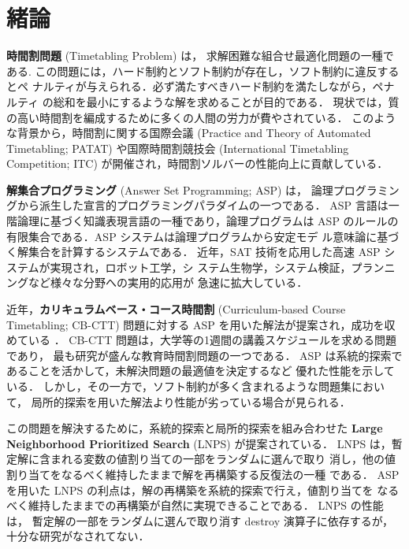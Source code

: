 \chapter{緒論}


\textbf{時間割問題} (Timetabling Problem) は，
求解困難な組合せ最適化問題の一種である.
この問題には，ハード制約とソフト制約が存在し，ソフト制約に違反するとペ
ナルティが与えられる．必ず満たすべきハード制約を満たしながら，ペナルティ
の総和を最小にするような解を求めることが目的である．
現状では，質の高い時間割を編成するために多くの人間の労力が費やされている．
このような背景から，時間割に関する国際会議
(Practice and Theory of Automated Timetabling; PATAT)
や国際時間割競技会 (International Timetabling Competition; ITC)
が開催され，時間割ソルバーの性能向上に貢献している．

\textbf{解集合プログラミング} (Answer Set Programming; ASP) 
\cite{%
  Baral03:cambridge,%
  Gelfond88:iclp,%
  Inoue08:jssst,%
  Niemela99:amai}
  は，
論理プログラミングから派生した宣言的プログラミングパラダイムの一つである．
ASP 言語は一階論理に基づく知識表現言語の一種であり，論理プログラムは
ASP のルールの有限集合である．ASP システムは論理プログラムから安定モデ
ル意味論に基づく解集合を計算するシステムである．
近年，SAT 技術を応用した高速 ASP システムが実現され，ロボット工学，シ
ステム生物学，システム検証，プランニングなど様々な分野への実用的応用が
急速に拡大している．

近年，\textbf{カリキュラムベース・コース時間割}
(Curriculum-based Course Timetabling; CB-CTT)
問題に対する ASP を用いた解法が提案され，成功を収めている
\cite{%
 banbara17:ramp}．
CB-CTT 問題は，大学等の1週間の講義スケジュールを求める問題であり，
最も研究が盛んな教育時間割問題の一つである．
ASP は系統的探索であることを活かして，未解決問題の最適値を決定するなど
優れた性能を示している．
しかし，その一方で，ソフト制約が多く含まれるような問題集において，
局所的探索を用いた解法より性能が劣っている場合が見られる．

この問題を解決するために，系統的探索と局所的探索を組み合わせた
\textbf{Large Neighborhood Prioritized Search} (LNPS)
\cite{%
 hayama19:kobe}
が提案されている．
LNPS は，暫定解に含まれる変数の値割り当ての一部をランダムに選んで取り
消し，他の値割り当てをなるべく維持したままで解を再構築する反復法の一種
である．
ASP を用いた LNPS の利点は，解の再構築を系統的探索で行え，値割り当てを
なるべく維持したままでの再構築が自然に実現できることである．
LNPS の性能は，
暫定解の一部をランダムに選んで取り消す destroy 演算子に依存するが，
十分な研究がなされてない．

